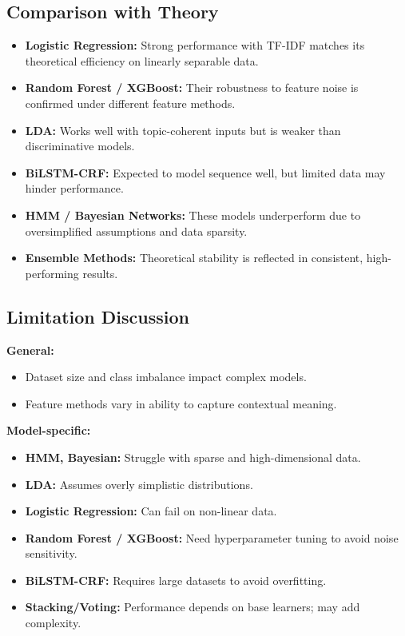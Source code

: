 \subsection{Comparison with Theory}

\begin{itemize}
    \item \textbf{Logistic Regression:} Strong performance with TF-IDF matches its theoretical efficiency on linearly separable data.
    \item \textbf{Random Forest / XGBoost:} Their robustness to feature noise is confirmed under different feature methods.
    \item \textbf{LDA:} Works well with topic-coherent inputs but is weaker than discriminative models.
    \item \textbf{BiLSTM-CRF:} Expected to model sequence well, but limited data may hinder performance.
    \item \textbf{HMM / Bayesian Networks:} These models underperform due to oversimplified assumptions and data sparsity.
    \item \textbf{Ensemble Methods:} Theoretical stability is reflected in consistent, high-performing results.
\end{itemize}

\subsection{Limitation Discussion}

\textbf{General:}

\begin{itemize}
    \item Dataset size and class imbalance impact complex models.
    \item Feature methods vary in ability to capture contextual meaning.
\end{itemize}

\textbf{Model-specific:}

\begin{itemize}
    \item \textbf{HMM, Bayesian:} Struggle with sparse and high-dimensional data.
    \item \textbf{LDA:} Assumes overly simplistic distributions.
    \item \textbf{Logistic Regression:} Can fail on non-linear data.
    \item \textbf{Random Forest / XGBoost:} Need hyperparameter tuning to avoid noise sensitivity.
    \item \textbf{BiLSTM-CRF:} Requires large datasets to avoid overfitting.
    \item \textbf{Stacking/Voting:} Performance depends on base learners; may add complexity.
\end{itemize}

